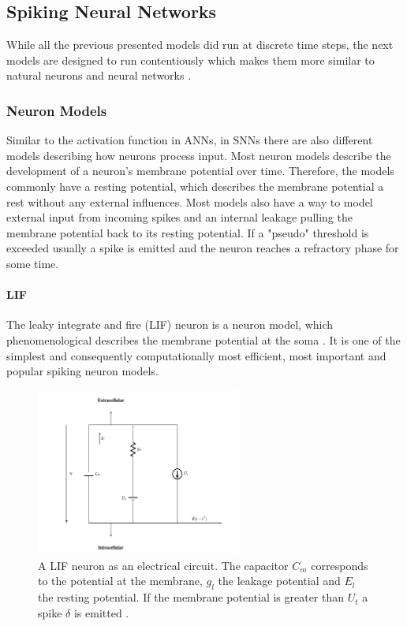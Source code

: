 \subsection{Spiking Neural Networks} \label{c:snns}

While all the previous presented models did run at discrete time steps, the next models are designed to run contentiously which makes them more similar to natural neurons and neural networks \cite{maass1997networks}. 

\subsubsection{Neuron Models} \label{c:snnneurons}

Similar to the activation function in ANNs, in SNNs there are also different models describing how neurons process input.
Most neuron models describe the development of a neuron's membrane potential over time.
Therefore, the models commonly have a resting potential, which describes the membrane potential a rest without any external influences. 
Most models also have a way to model external input from incoming spikes and an internal leakage pulling the membrane potential back to its resting potential. 
If a "pseudo" threshold is exceeded usually a spike is emitted and the neuron reaches a refractory phase for some time.

\paragraph{LIF} \label{c:lif}

The leaky integrate and fire (LIF) neuron is a neuron model, which phenomenological describes the membrane potential at the soma \cite{abbott1999lapicque}\cite{gerstner2014neuronal}\cite{Petrovici2016}. 
It is one of the simplest and consequently computationally most efficient, most important and popular spiking neuron models.  

\begin{figure}
	\centering
    	\includegraphics[width=0.6\textwidth]{imgs/lif.png} 
    \caption[A LIF neuron as an electrical circuit.]{A LIF neuron as an electrical circuit. The capacitor $C_m$ corresponds to the potential at the membrane, $g_l$ the leakage potential and $E_l$ the resting potential. If the membrane potential is greater than $U_t$ a spike $\delta$ is emitted \cite{heikoMA}.}
	\label{fig:lif}
\end{figure}


